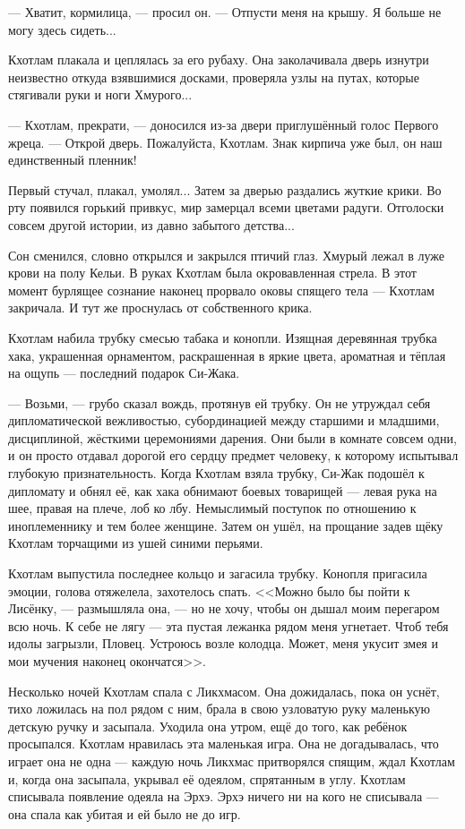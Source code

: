 --- Хватит, кормилица, --- просил он.
--- Отпусти меня на крышу.
Я больше не могу здесь сидеть...

Кхотлам плакала и цеплялась за его рубаху.
Она заколачивала дверь изнутри неизвестно откуда взявшимися досками, проверяла узлы на путах, которые стягивали руки и ноги Хмурого...

--- Кхотлам, прекрати, --- доносился из-за двери приглушённый голос Первого жреца.
--- Открой дверь.
Пожалуйста, Кхотлам.
Знак кирпича уже был, он наш единственный пленник!

Первый стучал, плакал, умолял...
Затем за дверью раздались жуткие крики.
Во рту появился горький привкус, мир замерцал всеми цветами радуги.
Отголоски совсем другой истории, из давно забытого детства...

Сон сменился, словно открылся и закрылся птичий глаз.
Хмурый лежал в луже крови на полу Кельи.
В руках Кхотлам была окровавленная стрела.
В этот момент бурлящее сознание наконец прорвало оковы спящего тела --- Кхотлам закричала.
И тут же проснулась от собственного крика.

Кхотлам набила трубку смесью табака и конопли.
Изящная деревянная трубка хака, украшенная орнаментом, раскрашенная в яркие цвета, ароматная и тёплая на ощупь --- последний подарок Си-Жака.

--- Возьми, --- грубо сказал вождь, протянув ей трубку.
Он не утруждал себя дипломатической вежливостью, субординацией между старшими и младшими, дисциплиной, жёсткими церемониями дарения.
Они были в комнате совсем одни, и он просто отдавал дорогой его сердцу предмет человеку, к которому испытывал глубокую признательность.
Когда Кхотлам взяла трубку, Си-Жак подошёл к дипломату и обнял её, как хака обнимают боевых товарищей --- левая рука на шее, правая на плече, лоб ко лбу.
Немыслимый поступок по отношению к иноплеменнику и тем более женщине.
Затем он ушёл, на прощание задев щёку Кхотлам торчащими из ушей синими перьями.

Кхотлам выпустила последнее кольцо и загасила трубку.
Конопля пригасила эмоции, голова отяжелела, захотелось спать.
<<Можно было бы пойти к Лисёнку, --- размышляла она, --- но не хочу, чтобы он дышал моим перегаром всю ночь.
К себе не лягу --- эта пустая лежанка рядом меня угнетает.
Чтоб тебя идолы загрызли, Пловец.
Устроюсь возле колодца.
Может, меня укусит змея и мои мучения наконец окончатся>>.

Несколько ночей Кхотлам спала с Ликхмасом.
Она дожидалась, пока он уснёт, тихо ложилась на пол рядом с ним, брала в свою узловатую руку маленькую детскую ручку и засыпала.
Уходила она утром, ещё до того, как ребёнок просыпался.
Кхотлам нравилась эта маленькая игра.
Она не догадывалась, что играет она не одна --- каждую ночь Ликхмас притворялся спящим, ждал Кхотлам и, когда она засыпала, укрывал её одеялом, спрятанным в углу.
Кхотлам списывала появление одеяла на Эрхэ.
Эрхэ ничего ни на кого не списывала --- она спала как убитая и ей было не до игр.

